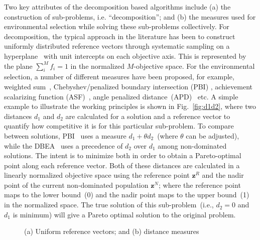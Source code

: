 \documentclass[twocolumn,10pt]{asme2ej}
\begin{document}
Two key attributes of the decomposition based algorithms include (a) the construction of sub-problems, i.e. ``decomposition''; and (b) the measures used for environmental selection while solving these sub-problems collectively. For decomposition, the typical approach in the literature has been to construct uniformly distributed reference vectors through systematic sampling on a hyperplane~\cite{KHTdas1998normal} with unit intercepts on each objective axis. This is represented by the plane $\sum^{M}_i{f_i}=1$ in the normalized $M$-objective space. For the environmental selection, a number of different measures have been proposed, for example, weighted sum~\cite{KHTmiettinen2012nonlinear,KHTVoss2008}, Chebyshev/penalized boundary intersection (PBI) \cite{KHTzhang2007moead}, achievement scalarizing function (ASF)~\cite{KHTmiettinen2012nonlinear,KHTYuan2016many}, angle penalized distance~(APD)~\cite{KHTCheng2016many} etc. A simple example to illustrate the working principles is shown in Fig.~\ref{fig:d1d2}, where two distances $d_1$ and $d_2$ are calculated for a solution and a reference vector to quantify how competitive it is for this particular sub-problem. To compare between solutions, PBI~\cite{KHTzhang2007moead} uses a measure $d_1+\theta d_2$~(where $\theta$ can be adjusted), while the DBEA~\cite{Asafuddoula2015} uses a precedence of $d_2$ over $d_1$ among non-dominated solutions. The intent is to minimize both in order to obtain a Pareto-optimal point along each reference vector. Both of these distances are calculated in a linearly normalized objective space using the reference point $\mathbf{z}^R$ and the nadir point of the current non-dominated population $\mathbf{z}^N$; where the reference point maps to the lower bound~(0) and the nadir point maps to the upper bound~(1) in the normalized space. The true solution of this sub-problem~(i.e., $d_2=0$ and $d_1$ is minimum) will give a Pareto optimal solution to the original problem. 

\begin{figure}[!htb]
\begin{center}
 \quad
{}\quad
\caption{(a) Uniform reference vectors; and (b) distance measures}
\label{fig:nbi}     
\end{center}
\end{figure}
\vspace{-1em}
\end{document}
